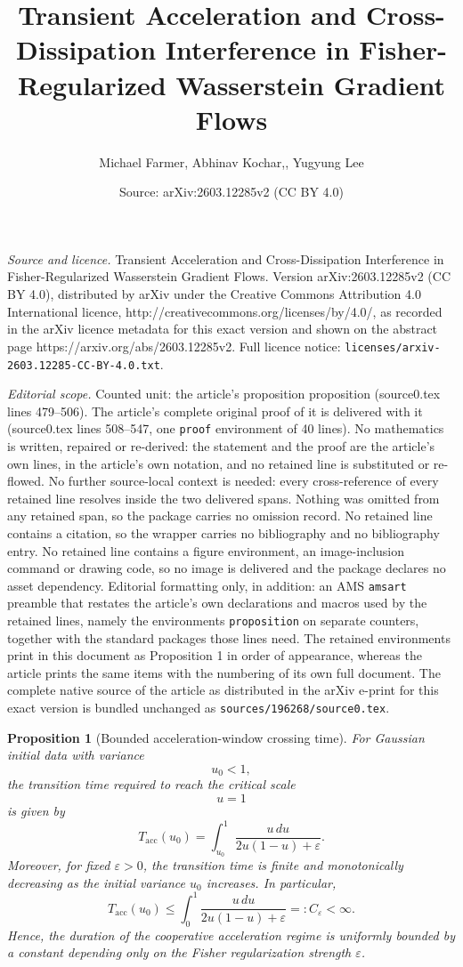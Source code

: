 \documentclass[10pt,a4paper]{amsart}
\title{Transient Acceleration and Cross-Dissipation Interference in Fisher-Regularized Wasserstein Gradient Flows}
\author{Michael Farmer, Abhinav Kochar,, Yugyung Lee}
\date{Source: arXiv:2603.12285v2 (CC BY 4.0)}
\newtheorem{proposition}{Proposition}
\begin{document}
\maketitle

\noindent\emph{Source and licence.} Transient Acceleration and Cross-Dissipation Interference in Fisher-Regularized Wasserstein Gradient Flows. Version arXiv:2603.12285v2 (CC BY 4.0), distributed by arXiv under the Creative Commons Attribution 4.0 International licence, http://creativecommons.org/licenses/by/4.0/, as recorded in the arXiv licence metadata for this exact version and shown on the abstract page https://arxiv.org/abs/2603.12285v2. Full licence notice: \texttt{licenses/arxiv-2603.12285-CC-BY-4.0.txt}.\par\smallskip

\noindent\textit{Editorial scope.} Counted unit: the article's proposition proposition (source0.tex lines 479--506). The article's complete original proof of it is delivered with it (source0.tex lines 508--547, one \texttt{proof} environment of 40 lines). No mathematics is written, repaired or re-derived: the statement and the proof are the article's own lines, in the article's own notation, and no retained line is substituted or re-flowed.  No further source-local context is needed: every cross-reference of every retained line resolves inside the two delivered spans.  Nothing was omitted from any retained span, so the package carries no omission record.  No retained line contains a citation, so the wrapper carries no bibliography and no bibliography entry.  No retained line contains a figure environment, an image-inclusion command or drawing code, so no image is delivered and the package declares no asset dependency.  Editorial formatting only, in addition: an AMS \texttt{amsart} preamble that restates the article's own declarations and macros used by the retained lines, namely the environments \texttt{proposition} on separate counters, together with the standard packages those lines need.  The retained environments print in this document as Proposition 1 in order of appearance, whereas the article prints the same items with the numbering of its own full document.  The complete native source of the article as distributed in the arXiv e-print for this exact version is bundled unchanged as \texttt{sources/196268/source0.tex}.
\begin{proposition}[Bounded acceleration-window crossing time]
For Gaussian initial data with variance
\[
u_0<1,
\]
the transition time required to reach the critical scale
\[
u=1
\]
is given by
\[
T_{\mathrm{acc}}(u_0)
=
\int_{u_0}^{1}
\frac{u\,du}
{2u(1-u)+\varepsilon}.
\]
Moreover, for fixed $\varepsilon>0$, the transition time is finite and monotonically decreasing as the initial variance $u_0$ increases. In particular,
\[
T_{\mathrm{acc}}(u_0)
\le
\int_{0}^{1}
\frac{u\,du}
{2u(1-u)+\varepsilon}
=: C_\varepsilon < \infty.
\]
Hence, the duration of the cooperative acceleration regime is uniformly bounded by a constant depending only on the Fisher regularization strength $\varepsilon$.
\end{proposition}
\end{document}
